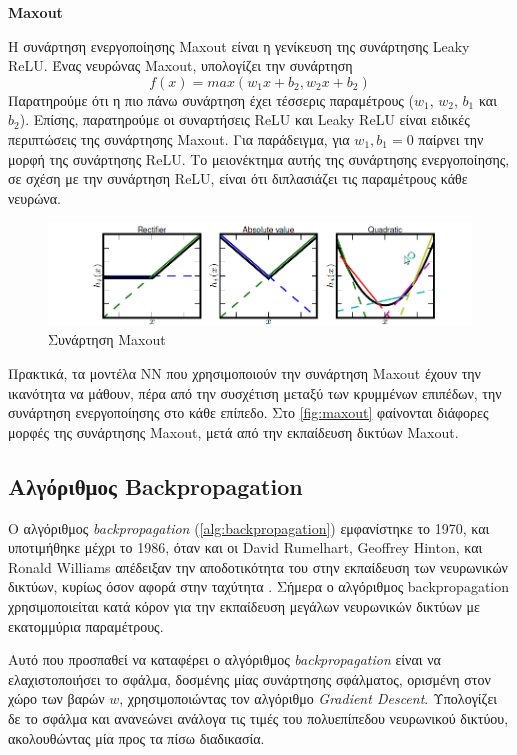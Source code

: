 \textbf{Maxout}

Η συνάρτηση ενεργοποίησης Maxout \cite{goodfellow2013maxout} είναι η γενίκευση της συνάρτησης Leaky ReLU.
Ένας νευρώνας Maxout, υπολογίζει την συνάρτηση
\begin{equation*}
  f(x) = max(w_{1}x+b_{2}, w_{2}x+b_{2})
\end{equation*}
Παρατηρούμε ότι η πιο πάνω συνάρτηση έχει τέσσερις παραμέτρους
($w_{1}$, $w_{2}$, $b_{1}$ και $b_{2}$). Επίσης, παρατηρούμε οι συναρτήσεις
ReLU και Leaky ReLU είναι ειδικές περιπτώσεις της συνάρτησης Maxout.
Για παράδειγμα, για $w_{1}, b_{1} = 0$ παίρνει την μορφή της συνάρτησης ReLU.
Το μειονέκτημα αυτής της συνάρτησης ενεργοποίησης, σε σχέση με την συνάρτηση
ReLU, είναι ότι διπλασιάζει τις παραμέτρους κάθε νευρώνα.

\begin{figure}[!ht]
  \centering
  \includegraphics[width=1\textwidth]{./images/chapter3/maxout.png}
  \caption[Συνάρτηση Maxout]{Συνάρτηση Maxout}
  \label{fig:maxout}
\end{figure}

Πρακτικά, τα μοντέλα ΝΝ που χρησιμοποιούν την συνάρτηση Maxout έχουν την
ικανότητα να μάθουν, πέρα από την συσχέτιση μεταξύ των κρυμμένων επιπέδων,
την συνάρτηση ενεργοποίησης στο κάθε επίπεδο.
Στο \autoref{fig:maxout} φαίνονται διάφορες μορφές της συνάρτησης Maxout,
μετά από την εκπαίδευση δικτύων Maxout.


\subsection{Αλγόριθμος Backpropagation}

Ο αλγόριθμος \emph{backpropagation} (\autoref{alg:backpropagation}) εμφανίστηκε το 1970, και υποτιμήθηκε
μέχρι το 1986, όταν και οι David Rumelhart, Geoffrey Hinton, και Ronald Williams
απέδειξαν την αποδοτικότητα του στην εκπαίδευση των νευρωνικών δικτύων, κυρίως
όσον αφορά στην ταχύτητα \cite{rumelhart1988learning}.
Σήμερα ο αλγόριθμος backpropagation χρησιμοποιείται κατά κόρον για την εκπαίδευση
μεγάλων νευρωνικών δικτύων με εκατομμύρια παραμέτρους.

Αυτό που προσπαθεί να καταφέρει ο αλγόριθμος \emph{backpropagation} είναι να
ελαχιστοποιήσει το σφάλμα, δοσμένης μίας συνάρτησης σφάλματος, ορισμένη στον χώρο
των βαρών $w$, χρησιμοποιώντας τον αλγόριθμο \emph{Gradient Descent}.
Υπολογίζει δε το σφάλμα και ανανεώνει ανάλογα τις τιμές του
πολυεπίπεδου νευρωνικού δικτύου, ακολουθώντας μία προς τα πίσω διαδικασία.

